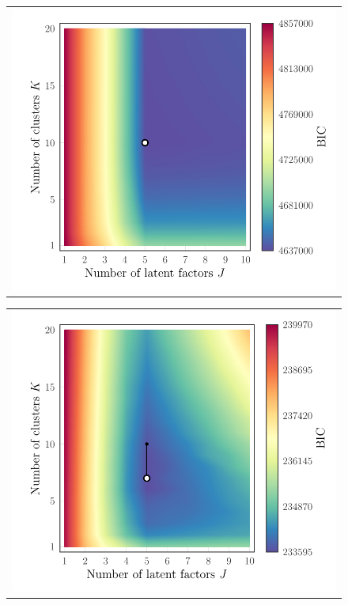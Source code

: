 \documentclass[twocolumn]{aastex62}
\begin{document}
\begin{figure}
	\begin{tabular}[b]{@{}p{}@{}}
		\centering\includegraphics[width=\linewidth]{experiments/eval-figs/eval-1-gridsearch-bic-contours.pdf} \\
	\end{tabular}
	\begin{tabular}[b]{@{}p{}@{}}
		\centering\includegraphics[width=\linewidth]{experiments/eval-figs/eval-2-gridsearch-bic-contours.pdf} \\
	\end{tabular}


\end{figure}
\end{document}
